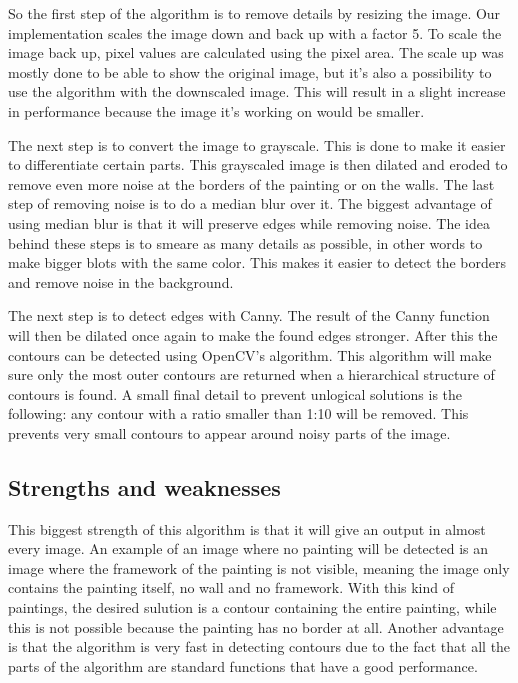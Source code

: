 So the first step of the algorithm is to remove details by resizing the image. Our implementation scales the image down and back up with a factor 5. To scale the image back up, pixel values are calculated using the pixel area. The scale up was mostly done to be able to show the original image, but it's also a possibility to use the algorithm with the downscaled image. This will result in a slight increase in performance because the image it's working on would be smaller.

The next step is to convert the image to grayscale. This is done to make it easier to differentiate certain parts. This grayscaled image is then dilated and eroded to remove even more noise at the borders of the painting or on the walls. The last step of removing noise is to do a median blur over it. The biggest advantage of using median blur is that it will preserve edges while removing noise. The idea behind these steps is to smeare as many details as possible, in other words to make bigger blots with the same color. This makes it easier to detect the borders and remove noise in the background.

The next step is to detect edges with Canny. The result of the Canny function will then be dilated once again to make the found edges stronger. After this the contours can be detected using OpenCV's algorithm. This algorithm will make sure only the most outer contours are returned when a hierarchical structure of contours is found. A small final detail to prevent unlogical solutions is the following: any contour with a ratio smaller than 1:10 will be removed. This prevents very small contours to appear around noisy parts of the image.

\subsection{Strengths and weaknesses}

This biggest strength of this algorithm is that it will give an output in almost every image. An example of an image where no painting will be detected is an image where the framework of the painting is not visible, meaning the image only contains the painting itself, no wall and no framework. With this kind of paintings, the desired sulution is a contour containing the entire painting, while this is not possible because the painting has no border at all. Another advantage is that the algorithm is very fast in detecting contours due to the fact that all the parts of the algorithm are standard functions that have a good performance.

